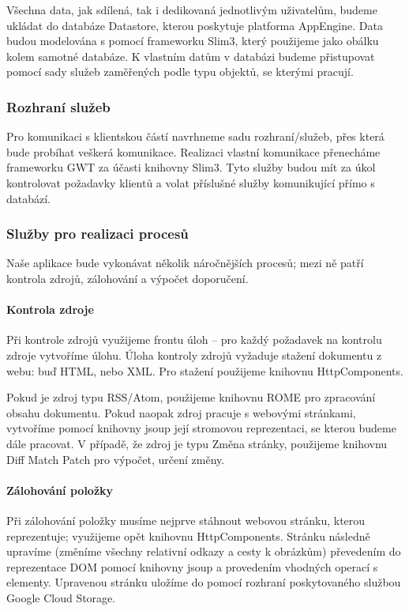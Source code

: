 Všechna data, jak sdílená, tak i dedikovaná jednotlivým uživatelům, budeme ukládat do databáze Datastore, kterou poskytuje platforma AppEngine.
Data budou modelována s pomocí frameworku Slim3, který použijeme jako obálku kolem samotné databáze.
K vlastním datům v databázi budeme přistupovat pomocí sady služeb zaměřených podle typu objektů, se kterými pracují.

\subsubsection{Rozhraní služeb}

Pro komunikaci s klientskou částí navrhneme sadu rozhraní/služeb, přes která bude probíhat veškerá komunikace.
Realizaci vlastní komunikace přenecháme frameworku GWT za účasti knihovny Slim3.
Tyto služby budou mít za úkol kontrolovat požadavky klientů a volat příslušné služby komunikující přímo s databází.

\subsubsection{Služby pro realizaci procesů}

Naše aplikace bude vykonávat několik náročnějších procesů; mezi ně patří kontrola zdrojů, zálohování a výpočet doporučení.

\paragraph{Kontrola zdroje}
Při kontrole zdrojů využijeme frontu úloh -- pro každý požadavek na kontrolu zdroje vytvoříme úlohu.
Úloha kontroly zdrojů vyžaduje stažení dokumentu z webu: buď HTML, nebo XML.
Pro stažení použijeme knihovnu HttpComponents.

Pokud je zdroj typu RSS/Atom, použijeme knihovnu ROME pro zpracování obsahu dokumentu.
Pokud naopak zdroj pracuje s webovými stránkami, vytvoříme pomocí knihovny jsoup její stromovou reprezentaci, se kterou budeme dále pracovat.
V případě, že zdroj je typu Změna stránky, použijeme knihovnu Diff Match Patch pro výpočet, určení změny.

\paragraph{Zálohování položky}
Při zálohování položky musíme nejprve stáhnout webovou stránku, kterou reprezentuje; využijeme opět knihovnu HttpComponents.
Stránku následně upravíme (změníme všechny relativní odkazy a cesty k obrázkům) převedením do reprezentace DOM pomocí knihovny jsoup a provedením vhodných operací s elementy.
Upravenou stránku uložíme do  pomocí rozhraní poskytovaného službou Google Cloud Storage.

